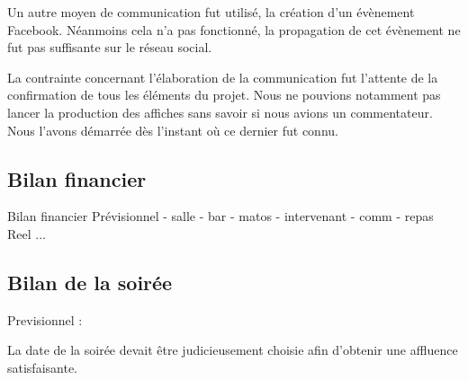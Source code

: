Un autre moyen de communication fut utilisé, la création d'un évènement Facebook. Néanmoins cela n'a pas fonctionné,
la propagation de cet évènement ne fut pas suffisante sur le réseau social.

La contrainte concernant l’élaboration de la communication fut l’attente de la confirmation de tous les éléments du projet.
Nous ne pouvions notamment pas lancer la production des affiches sans savoir si nous avions un commentateur. Nous l’avons démarrée
dès l’instant où ce dernier fut connu.

\subsection{Bilan financier}%
\label{sub:bilan_financier}

Bilan financier
        Prévisionnel
            - salle
            - bar
            - matos
            - intervenant
            - comm
            - repas
        Reel
           ...

\subsection{Bilan de la soirée}%
\label{sub:Bilan_de_la_soiree}

Previsionnel :

La date de la soirée devait être judicieusement choisie afin d'obtenir une affluence satisfaisante.

